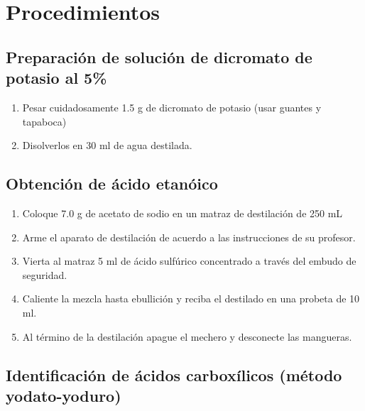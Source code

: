 \section{Procedimientos}

\subsection{Preparación de solución de dicromato de potasio al 5\%}
\begin{enumerate}
    \item Pesar cuidadosamente 1.5 g de dicromato de potasio (usar guantes y tapaboca)
    \item Disolverlos en 30 ml de agua destilada.
\end{enumerate}

\subsection{Obtención de ácido etanóico}

\begin{enumerate}
    \item Coloque 7.0 g de acetato de sodio en un matraz de destilación de 250 mL
    \item Arme el aparato de destilación de acuerdo a las instrucciones de su profesor.
    \item Vierta al matraz 5 ml de ácido sulfúrico concentrado a través del embudo de seguridad.
    \item Caliente la mezcla hasta ebullición y reciba el destilado en una probeta de 10 ml.
    \item Al término de la destilación apague el mechero y desconecte las mangueras. 
\end{enumerate}

\subsection{Identificación de ácidos carboxílicos (método yodato-yoduro)}

